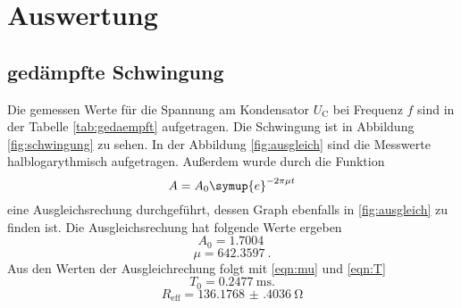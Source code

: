 \section{Auswertung}
\label{sec:Auswertung}

\subsection{gedämpfte Schwingung}
\label{sec:gedaempft}
Die gemessen Werte für die Spannung am Kondensator $U_\text{C}$ bei Frequenz $f$ sind in der Tabelle \ref{tab:gedaempft} aufgetragen.
Die Schwingung ist in Abbildung \ref{fig:schwingung} zu sehen.
In der Abbildung \ref{fig:ausgleich} sind die Messwerte halblogarythmisch aufgetragen.
Außerdem wurde durch die Funktion 
\begin{equation}
    A = A_0 \symup{e}^{-2 \pi \mu t}
\end{equation}
eine Ausgleichsrechung durchgeführt, dessen Graph ebenfalls in \ref{fig:ausgleich} zu finden ist.
Die Ausgleichsrechung hat folgende Werte ergeben
\begin{equation*}
    A_0 = \SI{1.7004}{}
\end{equation*}
\begin{equation*}
    \mu = \SI{642.3597}{}.
\end{equation*}
Aus den Werten der Ausgleichrechung folgt mit \eqref{eqn:mu} und \eqref{eqn:T}
\begin{equation*}
    T_0 = \SI{0.2477}{\milli\second}.
\end{equation*}
\begin{equation*}
    R_\text{eff} = \SI{136.1768(4036)}{\ohm}
\end{equation*}

